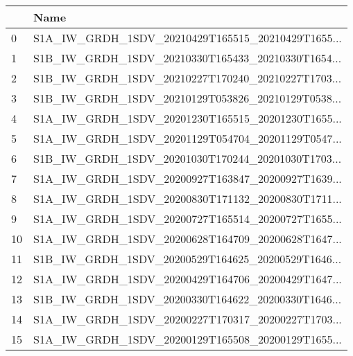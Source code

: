 \begin{tabular}{ll}
    \toprule
    {} &                              Name \\
    \midrule
    0   &  S1A\_IW\_GRDH\_1SDV\_20210429T165515\_20210429T1655... \\
    1   &  S1B\_IW\_GRDH\_1SDV\_20210330T165433\_20210330T1654... \\
    2   &  S1B\_IW\_GRDH\_1SDV\_20210227T170240\_20210227T1703... \\
    3   &  S1B\_IW\_GRDH\_1SDV\_20210129T053826\_20210129T0538... \\
    4   &  S1A\_IW\_GRDH\_1SDV\_20201230T165515\_20201230T1655... \\
    5   &  S1A\_IW\_GRDH\_1SDV\_20201129T054704\_20201129T0547... \\
    6   &  S1B\_IW\_GRDH\_1SDV\_20201030T170244\_20201030T1703... \\
    7   &  S1A\_IW\_GRDH\_1SDV\_20200927T163847\_20200927T1639... \\
    8   &  S1A\_IW\_GRDH\_1SDV\_20200830T171132\_20200830T1711... \\
    9   &  S1A\_IW\_GRDH\_1SDV\_20200727T165514\_20200727T1655... \\
    10  &  S1A\_IW\_GRDH\_1SDV\_20200628T164709\_20200628T1647... \\
    11  &  S1B\_IW\_GRDH\_1SDV\_20200529T164625\_20200529T1646... \\
    12  &  S1A\_IW\_GRDH\_1SDV\_20200429T164706\_20200429T1647... \\
    13  &  S1B\_IW\_GRDH\_1SDV\_20200330T164622\_20200330T1646... \\
    14  &  S1A\_IW\_GRDH\_1SDV\_20200227T170317\_20200227T1703... \\
    15  &  S1A\_IW\_GRDH\_1SDV\_20200129T165508\_20200129T1655... \\
    \bottomrule
    \end{tabular}